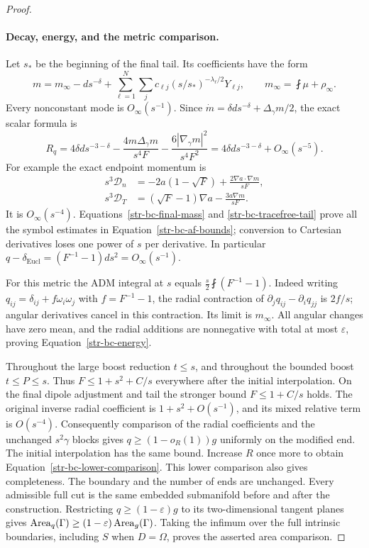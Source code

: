 \begin{proof}
\paragraph{Decay, energy, and the metric comparison.}
Let $s_*$ be the beginning of the final tail. Its coefficients have the form
\begin{equation}
 m=m_\infty-ds^{-\delta}
    +\sum_{\ell=1}^{N}\sum_j c_{\ell j}
          (s/s_*)^{-\lambda_\ell/2}Y_{\ell j},
 \qquad m_\infty=\fint\mu+\rho_\infty.
 \label{str-bc-final-mass}
\end{equation}
Every nonconstant mode is $O_\infty(s^{-1})$. Since
$\dot m=\delta ds^{-\delta}+\Delta_\gamma m/2$, the exact scalar formula is
\begin{equation}
 R_q=4\delta ds^{-3-\delta}
 -\frac{4m\Delta_\gamma m}{s^4F}
 -\frac{6|\nabla_\gamma m|^2}{s^4F^2}
 =4\delta ds^{-3-\delta}+O_\infty(s^{-5}).
 \label{str-bc-tail-scalar}
\end{equation}
For example the exact endpoint momentum is
\[
 \begin{split}
 s^3\mathcal D_n&=-2a(1-\sqrt F)
                  +\frac{2\nabla a\cdot\nabla m}{sF},\\
 s^3\mathcal D_T&=(\sqrt F-1)\nabla a
                  -\frac{3a\nabla m}{sF}.
 \end{split}
\]
It is $O_\infty(s^{-4})$. Equations~\eqref{str-bc-final-mass} and
\eqref{str-bc-tracefree-tail} prove all the symbol estimates in
Equation~\eqref{str-bc-af-bounds}; conversion to Cartesian derivatives
loses one power of $s$ per derivative. In particular
$q-\delta_{\mathrm{Eucl}}=(F^{-1}-1)ds^2=O_\infty(s^{-1})$.

For this metric the ADM integral at $s$ equals
$\frac{s}{2}\fint(F^{-1}-1)$. Indeed writing
$q_{ij}=\delta_{ij}+f\omega_i\omega_j$ with $f=F^{-1}-1$, the radial
contraction of $\partial_jq_{ij}-\partial_iq_{jj}$ is $2f/s$;
angular derivatives cancel in this contraction. Its limit is $m_\infty$.
All angular changes have zero mean, and the radial additions are
nonnegative with total at most $\varepsilon$, proving
Equation~\eqref{str-bc-energy}.

Throughout the large boost reduction $t\leq s$, and throughout the bounded
boost $t\leq P\leq s$. Thus $F\leq1+s^2+C/s$ everywhere after the initial
interpolation. On the final dipole adjustment and tail the stronger bound
$F\leq1+C/s$ holds. The original inverse radial coefficient is
$1+s^2+O(s^{-1})$, and its mixed relative term is $O(s^{-4})$.
Consequently comparison of the radial coefficients and the unchanged
$s^2\gamma$ blocks gives $q\geq(1-o_R(1))g$ uniformly on the modified
end. The initial interpolation has the same bound. Increase $R$ once more
to obtain Equation~\eqref{str-bc-lower-comparison}. This lower comparison
also gives completeness. The boundary and the number of ends are unchanged.
Every admissible full cut is the same embedded submanifold before and after
the construction. Restricting $q\geq(1-\varepsilon)g$ to its two-dimensional
tangent planes gives $\operatorname{Area}_q(\Gamma)\geq(1-\varepsilon)\operatorname{Area}_g(\Gamma)$.
Taking the infimum over the full intrinsic boundaries, including $S$ when
$D=\Omega$, proves the asserted area comparison.
\end{proof}

